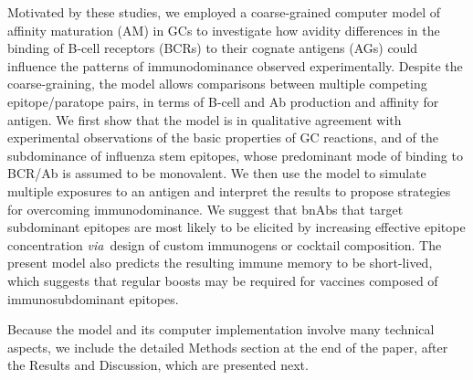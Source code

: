 \documentclass[utf8]{frontiersHLTH}%
\def\via {{\it via}}
\begin{document}
Motivated by these studies, we employed a coarse-grained computer model
of affinity maturation (AM) in GCs to investigate how avidity
differences in the binding of B-cell receptors (BCRs) to their cognate antigens
(AGs) could influence the patterns of immunodominance observed
experimentally. Despite the coarse-graining, the model allows
comparisons between multiple competing epitope/paratope pairs,
in terms of B-cell and Ab production and affinity for antigen. We first show
that the model is in qualitative agreement with experimental observations of
the basic properties of GC reactions,
and of the subdominance of influenza stem epitopes, whose predominant mode of binding to BCR/Ab
is assumed to be monovalent.
We then use the model to simulate multiple exposures to an antigen
and interpret the results to propose strategies for
overcoming immunodominance. We suggest that bnAbs that target subdominant
epitopes are most likely to be elicited by increasing effective epitope
concentration \via~design of custom immunogens or cocktail composition.
The present model also predicts the resulting immune memory to be
short-lived, which suggests that regular boosts may be required for vaccines
composed of immunosubdominant epitopes.

Because the model and its computer implementation involve many technical
aspects, we include the detailed Methods section at the end of the paper, after
the Results and Discussion, which are presented next.
\end{document}
